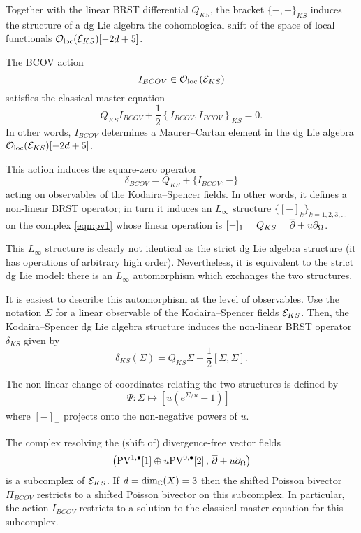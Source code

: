 \documentclass[11pt]{amsart}
\begin{document}

\subsubsection{}

Together with the linear BRST differential $Q_{KS}$, the bracket $\{-,-\}_{KS}$ induces the structure of a dg Lie algebra the cohomological shift of the space of local functionals ${\mathcal O}_{\rm loc}(\mathcal E_{KS})[-2d+5]$. 

\begin{thm}
The BCOV action 
\[
I_{BCOV} \in {\mathcal O}_{\rm loc} \left(\mathcal E_{KS} \right) 
\]
satisfies the classical master equation 
\[
Q_{KS} I_{BCOV} + \frac12 \left\{I_{BCOV}, I_{BCOV}\right\}_{KS} = 0 .
\]
In other words, $I_{BCOV}$ determines a Maurer--Cartan element in the dg Lie algebra ${\mathcal O}_{\rm loc}(\mathcal E_{KS})[-2d+5]$.
\end{thm}

This action induces the square-zero operator 
\[
\delta_{BCOV} = Q_{KS} + \{I_{BCOV}, -\} 
\]
acting on observables of the Kodaira--Spencer fields. 
In other words, it defines a non-linear BRST operator; in turn it
induces an $L_\infty$ structure $\{[-]_k\}_{k =1,2,3,\ldots}$ on the complex \eqref{eqn:pv1} whose linear operation is $[-]_1 = Q_{KS} = \overline{\partial} + u\partial_{\Omega}$. 

This $L_\infty$ structure is clearly not identical as the strict dg Lie algebra structure (it has operations of arbitrary high order). 
Nevertheless, it is equivalent to the strict dg Lie model: there is an $L_\infty$ automorphism which exchanges the two structures.

It is easiest to describe this automorphism at the level of observables.
Use the notation $\Sigma$ for a linear observable of the Kodaira--Spencer fields $\mathcal E_{KS}$. 
Then, the Kodaira--Spencer dg Lie algebra structure induces the non-linear BRST operator $\delta_{KS}$ given by
\[
\delta_{KS} (\Sigma) = Q_{KS} \Sigma + \frac12 [\Sigma,\Sigma] .
\]

The non-linear change of coordinates relating the two structures is defined by
\[
\Psi \colon \Sigma \mapsto \left[u (e^{\Sigma/u} -1)\right]_+
\]
where $[-]_+$ projects onto the non-negative powers of $u$.  

\parsec[]

The complex resolving the (shift of) divergence-free vector fields 
\[
\left({\rm PV}^{1,\bullet}[1] \oplus u {\rm PV}^{0,\bullet}[2] \, , \, \overline{\partial} + u \partial_{\Omega}\right) 
\]
is a subcomplex of $\mathcal E_{KS}$.
If $d = \dim_\mathbb C(X)=3$ then the shifted Poisson bivector $\Pi_{BCOV}$ restricts to a shifted Poisson bivector on this subcomplex. 
In particular, the action $I_{BCOV}$ restricts to a solution to the classical master equation for this subcomplex. 
\end{document}
